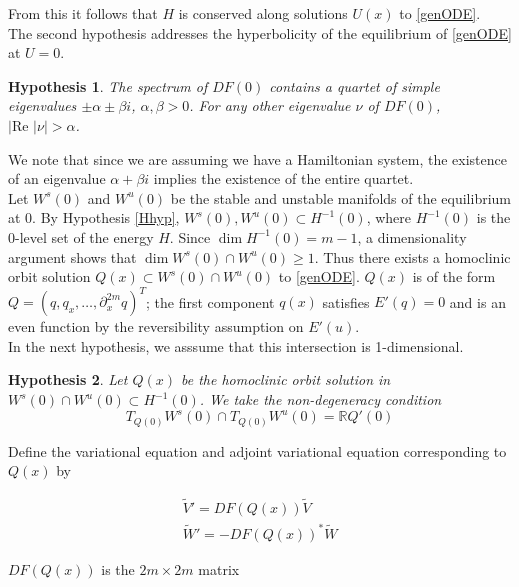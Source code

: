 \documentclass[12pt]{article}
\def\R{{\mathbb R}}
\DeclareMathOperator{\dm}{dim}
\newtheorem{hypothesis}{Hypothesis}
\begin{document}
From this it follows that $H$ is conserved along solutions $U(x)$ to \eqref{genODE}.\\

The second hypothesis addresses the hyperbolicity of the equilibrium of \eqref{genODE} at $U = 0$.  

\begin{hypothesis}\label{hypeq}
The spectrum of $DF(0)$ contains a quartet of simple eigenvalues $\pm \alpha \pm \beta i$, $\alpha, \beta > 0$. For any other eigenvalue $\nu$ of $DF(0)$, $|\text{Re }|\nu| > \alpha$.
\end{hypothesis}

We note that since we are assuming we have a Hamiltonian system, the existence of an eigenvalue $\alpha + \beta i$ implies the existence of the entire quartet.\\

Let $W^s(0)$ and $W^u(0)$ be the stable and unstable manifolds of the equilibrium at 0. By Hypothesis \ref{Hhyp}, $W^s(0), W^u(0) \subset H^{-1}(0)$, where $H^{-1}(0)$ is the 0-level set of the energy $H$. Since $\dm H^{-1}(0) = m-1$, a dimensionality argument shows that $\dim W^s(0) \cap W^u(0) \geq 1$. Thus there exists a homoclinic orbit solution $Q(x) \subset W^s(0) \cap W^u(0)$ to \eqref{genODE}. $Q(x)$ is of the form $Q = (q, q_x, \dots, \partial_x^{2m} q)^T$; the first component $q(x)$ satisfies $E'(q) = 0$ and is an even function by the reversibility assumption on $E'(u)$.\\

In the next hypothesis, we asssume that this intersection is 1-dimensional. 

\begin{hypothesis}\label{nondegen1}
Let $Q(x)$ be the homoclinic orbit solution in $W^s(0) \cap W^u(0) \subset H^{-1}(0)$. We take the non-degeneracy condition
\begin{equation}
T_{Q(0)}W^s(0) \cap T_{Q(0)}W^u(0) = \R Q'(0)
\end{equation}
\end{hypothesis}

Define the variational equation and adjoint variational equation corresponding to $Q(x)$ by

\begin{align}
\tilde{V}' = DF(Q(x))\tilde{V} \label{vareq1} \\
\tilde{W}' = -DF(Q(x))^* \tilde{W} \label{adjvareq1}
\end{align}

$DF(Q(x))$ is the $2m \times 2m$ matrix
\end{document}
